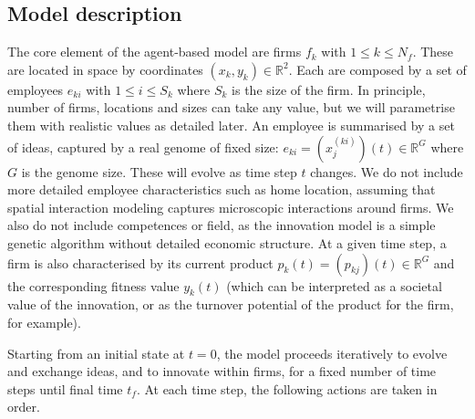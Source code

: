 \documentclass[letterpaper]{article}
\begin{document}
\subsection{Model description}

The core element of the agent-based model are firms $f_k$ with $1 \leq k \leq N_f$. These are located in space by coordinates $(x_k,y_k) \in \mathbb{R}^2$. Each are composed by a set of employees $e_{ki}$ with $1 \leq i \leq S_k$ where $S_k$ is the size of the firm. In principle, number of firms, locations and sizes can take any value, but we will parametrise them with realistic values as detailed later. An employee is summarised by a set of ideas, captured by a real genome of fixed size: $e_{ki} = (x^{(ki)}_j) (t) \in \mathbb{R}^G$ where $G$ is the genome size. These will evolve as time step $t$ changes. We do not include more detailed employee characteristics such as home location, assuming that spatial interaction modeling captures microscopic interactions around firms. We also do not include competences or field, as the innovation model is a simple genetic algorithm without detailed economic structure. At a given time step, a firm is also characterised by its current product $p_k (t) = (p_{kj})(t)\in \mathbb{R}^G$ and the corresponding fitness value $y_k (t)$ (which can be interpreted as a societal value of the innovation, or as the turnover potential of the product for the firm, for example).

Starting from an initial state at $t = 0$, the model proceeds iteratively to evolve and exchange ideas, and to innovate within firms, for a fixed number of time steps until final time $t_f$. At each time step, the following actions are taken in order.
\end{document}
